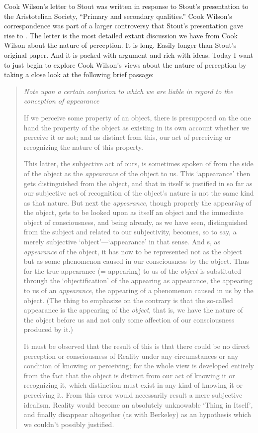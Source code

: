 \documentclass[12pt]{article}
\begin{document}
Cook Wilson's letter to Stout was written in response to Stout's \citeyearpar{Stout:1903zl} presentation to the Aristotelian Society, ``Primary and secondary qualities.'' Cook Wilson's correspondence was part of a larger controversy that Stout's presentation gave rise to \citep[see][for how this debate played out in Edwardian philosophy]{Nassim:2008fk}. The letter is the most detailed extant discussion we have from Cook Wilson about the nature of perception. It is long. Easily longer than Stout's original paper. And it is packed with argument and rich with ideas. Today I want to just begin to explore Cook Wilson's views about the nature of perception by taking a close look at the following brief passage:
\begin{quotation}
	\noindent \emph{Note upon a certain confusion to which we are liable in regard to the conception of appearance}
	
	If we perceive some property of an object, there is presupposed on the one hand the property of the object as existing in its own account whether we perceive it or not; and as distinct from this, our act of perceiving or recognizing the nature of this property.
	
	This latter, the subjective act of ours, is sometimes spoken of from the side of the object as the \emph{appearance} of the object to us. This `appearance' then gets distinguished from the object, and that in itself is justified in so far as our subjective act of recognition of the object's nature is not the same kind as that nature. But next the \emph{appearance}, though properly the appear\emph{ing} of the object, gets to be looked upon as itself an object and the immediate object of consciousness, and being already, as we have seen, distinguished from the subject and related to our subjectivity, becomes, so to say, a merely subjective `object'---`appearance' in that sense. And s, as \emph{appearance} of the object, it has now to be represented not as the object but as some phenomenon caused in our consciousness by the object. Thus for the true appearance (= appearing) to us of the \emph{object} is substituted through the `objectification' of the appearing as appearance, the appearing to us of an \emph{appearance}, the appearing of a phenomenon caused in us by the object. (The thing to emphasize on the contrary is that the so-called appearance is the appearing of the \emph{object}, that is, we have the nature of the object before us and not only some affection of our consciousness produced by it.)

	It must be observed that the result of this is that there could be no direct perception or consciousness of Reality under any circumstances or any condition of knowing or perceiving; for the whole view is developed entirely from the fact that the object is distinct from our act of knowing it or recognizing it, which distinction must exist in any kind of knowing it or perceiving it. From this error would necessarily result a mere subjective idealism. Reality would become an absolutely unknowable `Thing in Itself', and finally disappear altogether (as with Berkeley) as an hypothesis which we couldn't possibly justified. \citep[\emph{Correspondence with Stout 1904},][796-797]{Cook-Wilson:1926sf}
\end{quotation}
\end{document}

